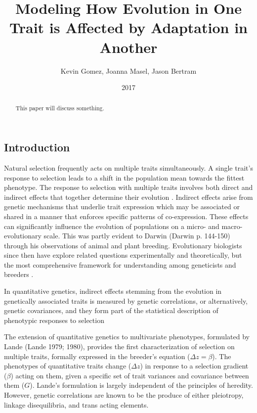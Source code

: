 \documentclass[11pt,one column]{article}
\begin{document}
\begin{multicols}{2}

\title{Modeling How Evolution in One Trait is Affected by Adaptation in Another}
\author{Kevin Gomez, Joanna Masel, Jason Bertram}
\date{2017}
\maketitle

\begin{abstract}
This paper will discuss something.
\end{abstract}

\section*{Introduction}
Natural selection frequently acts on multiple traits simultaneously. A single trait’s response to selection leads to a shift in the population mean towards the fittest phenotype.  The response to selection with multiple traits involves both direct and indirect effects that together determine their evolution \cite{Scarcelli23102007,Lovell2013,Wagner2011}.  Indirect effects arise from genetic mechanisms that underlie trait expression which may be associated or shared in a manner that enforces specific patterns of co-expression.  These effects can significantly influence the evolution of populations on a micro- and macro-evolutionary scale.  This was partly evident to Darwin (Darwin p. 144-150) through his observations of animal and plant breeding.  Evolutionary biologists since then have explore related questions experimentally and theoretically, but the most comprehensive framework for understanding  among geneticists and breeders .\par

In quantitative genetics, indirect effects stemming from the evolution in genetically associated traits is measured by genetic correlations, or alternatively, genetic covariances, and they form part of the statistical description of phenotypic responses to selection 

The extension of quantitative genetics to multivariate phenotypes, formulated by Lande (Lande 1979; 1980), provides the first characterization of selection on multiple traits, formally expressed in the breeder’s equation ($\Delta z = \beta$). The phenotypes of quantitative traits change ($\Delta z$) in response to a selection gradient ($\beta$) acting on them, given a specific set of trait variances and covariance between them ($G$). Lande’s formulation is largely independent of the principles of heredity.  However, genetic correlations are known to be the produce of either pleiotropy, linkage disequilibria, and trans acting elements.\par


\end{multicols}
\end{document}
